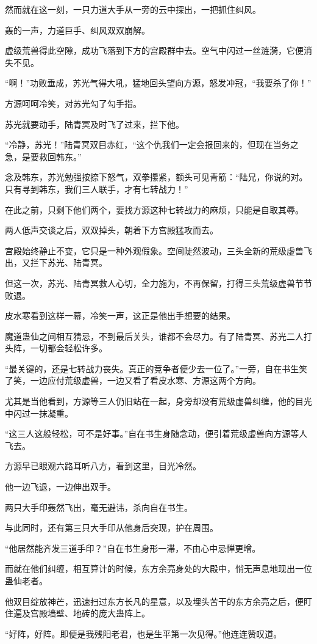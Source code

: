 \begin{this_body}
然而就在这一刻，一只力道大手从一旁的云中探出，一把抓住纠风。

轰的一声，力道巨手、纠风双双崩解。

虚级荒兽得此空隙，成功飞落到下方的宫殿群中去。空气中闪过一丝涟漪，它便消失不见。

“啊！”功败垂成，苏光气得大吼，猛地回头望向方源，怒发冲冠，“我要杀了你！”

方源呵呵冷笑，对苏光勾了勾手指。

苏光就要动手，陆青冥及时飞了过来，拦下他。

“冷静，苏光！”陆青冥双目赤红，“这个仇我们一定会报回来的，但现在当务之急，是要救回韩东。”

念及韩东，苏光勉强按捺下怒气，双拳攥紧，额头可见青筋：“陆兄，你说的对。只有寻到韩东，我们三人联手，才有七转战力！”

在此之前，只剩下他们两个，要找方源这种七转战力的麻烦，只能是自取其辱。

两人低声交谈之后，双双掉头，朝着下方宫殿猛攻而去。

宫殿始终静止不变，它只是一种外观假象。空间陡然波动，三头全新的荒级虚兽飞出，又拦下苏光、陆青冥。

但这一次，苏光、陆青冥救人心切，全力施为，不再保留，打得三头荒级虚兽节节败退。

皮水寒看到这样一幕，冷笑一声，这正是他出手想要的结果。

魔道蛊仙之间相互猜忌，不到最后关头，谁都不会尽力。有了陆青冥、苏光二人打头阵，一切都会轻松许多。

“最关键的，还是七转战力丧失。真正的竞争者便少去一位了。”一旁，自在书生笑了笑，一边应付荒级虚兽，一边又看了看皮水寒、方源这两个方向。

尤其是当他看到，方源等三人仍旧站在一起，身旁却没有荒级虚兽纠缠，他的目光中闪过一抹凝重。

“这三人这般轻松，可不是好事。”自在书生身随念动，便引着荒级虚兽向方源等人飞去。

方源早已眼观六路耳听八方，看到这里，目光冷然。

他一边飞退，一边伸出双手。

两只大手印轰然飞出，毫无避讳，杀向自在书生。

与此同时，还有第三只大手印从他身后突现，护在周围。

“他居然能齐发三道手印？”自在书生身形一滞，不由心中忌惮更增。

而就在他们纠缠，相互算计的时候，东方余亮身处的大殿中，悄无声息地现出一位蛊仙老者。

他双目绽放神芒，迅速扫过东方长凡的星意，以及埋头苦干的东方余亮之后，便盯住遍及宫殿墙壁、地砖的庞大蛊阵上。

“好阵，好阵。即便是我残阳老君，也是生平第一次见得。”他连连赞叹道。

\end{this_body}


